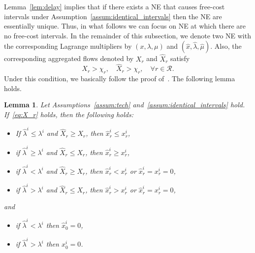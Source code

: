 \documentclass[letterpaper, 10 pt, conference]{ieeeconf}  %
\newcommand{\mc}[1]{\mathcal{#1}}
\newtheorem{lem}{Lemma}
\begin{document}
Lemma~\ref{lem:delay} implies that if there exists a NE that causes free-cost intervals under Assumption~\ref{assum:identical_intervals} then the NE are essentially unique.
Thus, in what follows we can focus on NE at which there are no free-cost intervals.
In the remainder of this subsection, we denote two NE with the corresponding Lagrange multipliers by $(x,\lambda,\mu)$ and $(\hat{x},\hat{\lambda},\hat{\mu})$.
Also, the corresponding aggregated flows denoted by $X_r$ and $\hat{X}_r$ satisfy
\begin{equation}\label{eq:X_r}
 X_r>\chi_r,\quad \hat{X}_r > \chi_r,\quad \forall r\in\mc{R}.
\end{equation}
Under this condition, we basically follow the proof of~\cite[Theorem 2]{Jacquot2018Analysis}.
The following lemma holds.
\begin{lem}\label{lem:ineq}
Let Assumptions~\ref{assum:tech} and~\ref{assum:identical_intervals} hold.
If~\eqref{eq:X_r} holds, then
the following holds:
\begin{itemize}
\item If $\hat{\lambda}^i\leq \lambda^i$ and $\hat{X}_r\geq X_r$, then $\hat{x}^i_r\leq x^i_r$,
\item if $\hat{\lambda}^i\geq \lambda^i$ and $\hat{X}_r\leq X_r$, then $\hat{x}^i_r\geq x^i_r$,
\item if $\hat{\lambda}^i< \lambda^i$ and $\hat{X}_r\geq X_r$, then $\hat{x}^i_r< x^i_r$ or $\hat{x}^i_r=x^i_r=0$,
\item if $\hat{\lambda}^i> \lambda^i$ and $\hat{X}_r\leq X_r$, then $\hat{x}^i_r> x^i_r$ or $\hat{x}^i_r=x^i_r=0$,
\end{itemize}
and
\begin{itemize}
\item if $\hat{\lambda}^i<\lambda^i$ then $\hat{x}^i_0=0$,
\item if $\hat{\lambda}^i>\lambda^i$ then $x^i_0=0$.
\end{itemize}
\end{lem}
\end{document}
